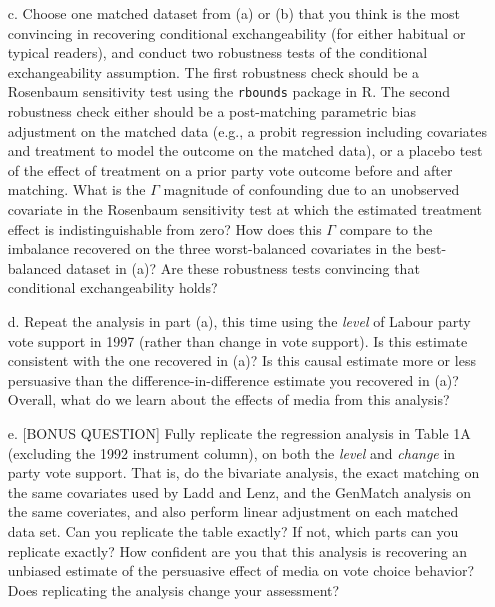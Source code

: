 \documentclass{article}
\begin{document}
\begin{itemize}
\item[c.] Choose one matched dataset from (a) or (b) that you think is
  the most convincing in recovering conditional exchangeability (for
  either habitual or typical readers), and conduct two robustness
  tests of the conditional exchangeability assumption.  The first
  robustness check should be a Rosenbaum sensitivity test using the
  \texttt{rbounds} package in {R}.  The second robustness check either
  should be a post-matching parametric bias adjustment on the matched
  data (e.g., a probit regression including covariates and treatment
  to model the outcome on the matched data), or a placebo test of the
  effect of treatment on a prior party vote outcome before and after
  matching.  What is the $\Gamma$ magnitude of confounding due to an
  unobserved covariate in the Rosenbaum sensitivity test at which the
  estimated treatment effect is indistinguishable from zero?  How does
  this $\Gamma$ compare to the imbalance recovered on the three
  worst-balanced covariates in the best-balanced dataset in (a)?  Are
  these robustness tests convincing that conditional exchangeability
  holds?


\item[d.] Repeat the analysis in part (a), this time using the {\em
    level} of Labour party vote support in 1997 (rather than change in
  vote support). Is this estimate consistent with the one recovered in
  (a)?  Is this causal estimate more or less persuasive than the
  difference-in-difference estimate you recovered in (a)?   Overall, what do we learn about the effects of media from this
  analysis?  






\item[e.] [BONUS QUESTION] Fully replicate the regression analysis in
  Table 1A (excluding the 1992 instrument column), on both the {\em
    level} and {\em change} in party vote support.  That is, do the
  bivariate analysis, the exact matching on the same covariates used
  by Ladd and Lenz, and the GenMatch analysis on the same coveriates,
  and also perform linear adjustment on each matched data set.  Can
  you replicate the table exactly? If not, which parts can you
  replicate exactly? How confident are you that this analysis is
  recovering an unbiased estimate of the persuasive effect of media on
  vote choice behavior? Does replicating the analysis change your
  assessment?







\end{itemize}
\end{document}
